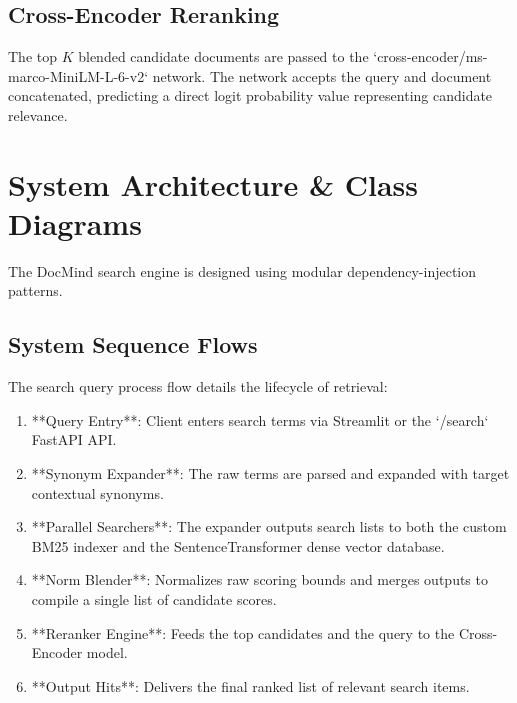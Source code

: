 \documentclass[11pt,journal,onecolumn]{IEEEtran}
\begin{document}
\subsection{Cross-Encoder Reranking}
The top $K$ blended candidate documents are passed to the `cross-encoder/ms-marco-MiniLM-L-6-v2` network. The network accepts the query and document concatenated, predicting a direct logit probability value representing candidate relevance.

\section{System Architecture \& Class Diagrams}
The DocMind search engine is designed using modular dependency-injection patterns.

\subsection{System Sequence Flows}
The search query process flow details the lifecycle of retrieval:
\begin{enumerate}
    \item **Query Entry**: Client enters search terms via Streamlit or the `/search` FastAPI API.
    \item **Synonym Expander**: The raw terms are parsed and expanded with target contextual synonyms.
    \item **Parallel Searchers**: The expander outputs search lists to both the custom BM25 indexer and the SentenceTransformer dense vector database.
    \item **Norm Blender**: Normalizes raw scoring bounds and merges outputs to compile a single list of candidate scores.
    \item **Reranker Engine**: Feeds the top candidates and the query to the Cross-Encoder model.
    \item **Output Hits**: Delivers the final ranked list of relevant search items.
\end{enumerate}
\end{document}
